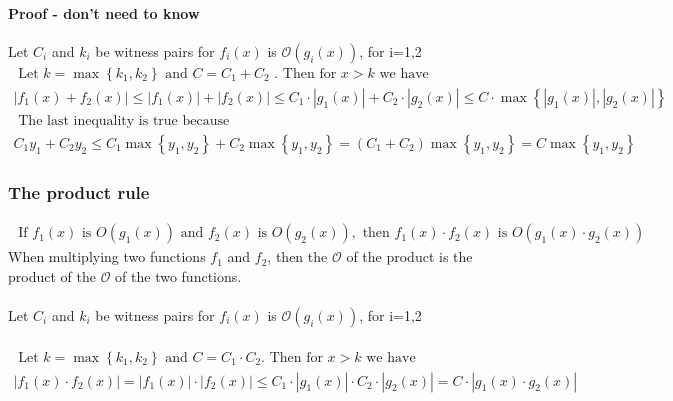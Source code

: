 \documentclass{article}[18pt]
\begin{document}
\paragraph{Proof - don't need to know}\mbox{}


Let $C_i$ and $k_i$ be witness pairs for $f_i(x)$ is $\mathcal{O}(g_i(x))$, for i=1,2\\

$\begin{array} { l } { \text { Let } k = \max \left\{ k _ { 1 } , k _ { 2 } \right\} \text { and } C = C _ { 1 } + C _ { 2 } \text { . Then for } x > k \text { we have } } \\ { \left| f _ { 1 } ( x ) + f _ { 2 } ( x ) \right| \leq \left| f _ { 1 } ( x ) \right| + \left| f _ { 2 } ( x ) \right| \leq C _ { 1 } \cdot \left| g _ { 1 } ( x ) \right| + C _ { 2 } \cdot \left| g _ { 2 } ( x ) \right| \leq } { C \cdot \max \left\{ \left| g _ { 1 } ( x ) \right| , \left| g _ { 2 } ( x ) \right| \right\} } \end{array}$
\\
$\begin{array} { l } { \text { The last inequality is true because } } \\ { C _ { 1 } y _ { 1 } + C _ { 2 } y _ { 2 } \leq C _ { 1 } \max \left\{ y _ { 1 } , y _ { 2 } \right\} + C _ { 2 } \max \left\{ y _ { 1 } , y _ { 2 } \right\} = } { \left( C _ { 1 } + C _ { 2 } \right) \max \left\{ y _ { 1 } , y _ { 2 } \right\} = C \max \left\{ y _ { 1 } , y _ { 2 } \right\} } \end{array}$
\subsubsection{The product rule}
$$\begin{array} { l } { \text { If } f _ { 1 } ( x ) \text { is } O \left( g _ { 1 } ( x ) \right) \text { and } f _ { 2 } ( x ) \text { is } O \left( g _ { 2 } ( x ) \right) , \text { then } f _ { 1 } ( x ) \cdot f _ { 2 } ( x ) \text { is } } { O \left( g _ { 1 } ( x ) \cdot g _ { 2 } ( x ) \right) } \end{array}$$
When multiplying two functions $f_1$ and $f_2$, then the $\mathcal{ O }$ of the product is the product of the $\mathcal{ O }$ of the two functions.\\
\\





Let $C_i$ and $k_i$ be witness pairs for $f_i(x)$ is $\mathcal{O}(g_i(x))$, for i=1,2\\
\\
$\begin{array} { l } { \text { Let } k = \max \left\{ k _ { 1 } , k _ { 2 } \right\} \text { and } C = C _ { 1 } \cdot C _ { 2 } . \text { Then for } x > k \text { we have } } \\ { \left| f _ { 1 } ( x ) \cdot f _ { 2 } ( x ) \right| = \left| f _ { 1 } ( x ) \right| \cdot \left| f _ { 2 } ( x ) \right| \leq C _ { 1 } \cdot \left| g _ { 1 } ( x ) \right| \cdot C _ { 2 } \cdot \left| g _ { 2 } ( x ) \right| = }  { C \cdot \left| g _ { 1 } ( x ) \cdot g _ { 2 } ( x ) \right| } \end{array}$
\end{document}
